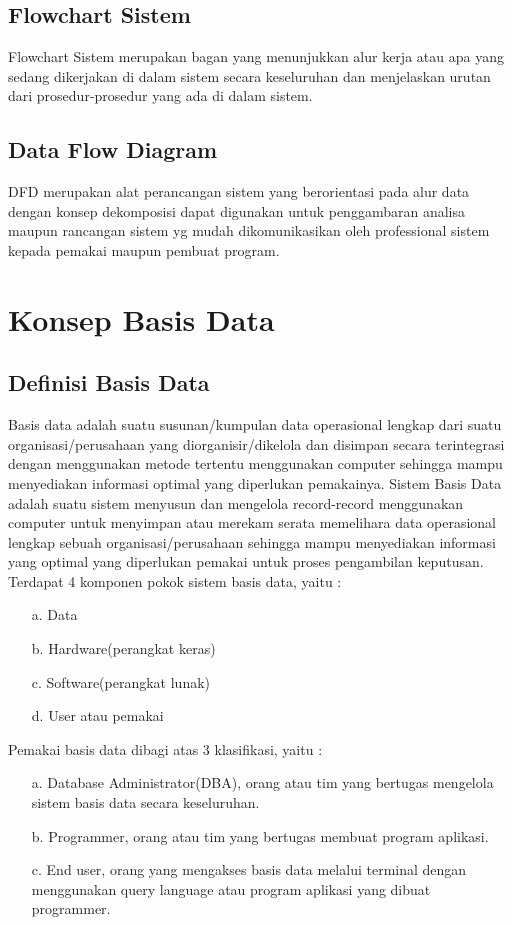 \documentclass{jtetiproposalskripsi}
\begin{document}
\subsection{Flowchart Sistem}
Flowchart Sistem merupakan bagan yang menunjukkan alur kerja atau apa yang sedang dikerjakan di dalam sistem secara keseluruhan dan menjelaskan urutan dari prosedur-prosedur yang ada di dalam sistem. 
\subsection{Data Flow Diagram}
DFD merupakan alat perancangan sistem yang berorientasi pada alur data dengan konsep dekomposisi dapat digunakan untuk penggambaran analisa maupun rancangan sistem yg mudah dikomunikasikan oleh professional sistem kepada pemakai maupun pembuat program. 

\section{Konsep Basis Data}
\subsection{Definisi Basis Data}
Basis data adalah suatu susunan/kumpulan data operasional lengkap dari suatu organisasi/perusahaan yang diorganisir/dikelola dan disimpan secara terintegrasi dengan menggunakan metode tertentu menggunakan computer sehingga mampu menyediakan informasi optimal yang diperlukan pemakainya.
Sistem Basis Data adalah suatu sistem menyusun dan mengelola record-record menggunakan computer untuk menyimpan atau merekam serata memelihara data operasional lengkap sebuah organisasi/perusahaan sehingga mampu menyediakan informasi yang optimal yang diperlukan pemakai untuk proses pengambilan keputusan.
\\

Terdapat 4 komponen pokok sistem basis data, yaitu :
\begin{itemize}
\item[a.] Data 
\item[b.] Hardware(perangkat keras) 
\item[c.] Software(perangkat lunak) 
\item[d.] User atau pemakai
\end{itemize} 
 
Pemakai basis data dibagi atas 3 klasifikasi, yaitu : 
\begin{itemize}
\item[a.] Database Administrator(DBA), orang atau tim yang bertugas mengelola sistem basis data secara keseluruhan. 
\item[b.] Programmer, orang atau tim yang bertugas membuat program aplikasi. 
\item[c.] End user, orang yang mengakses basis data melalui terminal dengan menggunakan query language atau program aplikasi yang dibuat programmer. 
\end{itemize}
\end{document}
